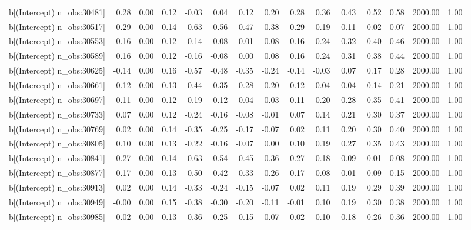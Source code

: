 \begin{table}[ht]
\begin{tabular}{rrrrrrrrrrrrrrr}
  b[(Intercept) n\_obs:30481] & 0.28 & 0.00 & 0.12 & -0.03 & 0.04 & 0.12 & 0.20 & 0.28 & 0.36 & 0.43 & 0.52 & 0.58 & 2000.00 & 1.00 \\ 
  b[(Intercept) n\_obs:30517] & -0.29 & 0.00 & 0.14 & -0.63 & -0.56 & -0.47 & -0.38 & -0.29 & -0.19 & -0.11 & -0.02 & 0.07 & 2000.00 & 1.00 \\ 
  b[(Intercept) n\_obs:30553] & 0.16 & 0.00 & 0.12 & -0.14 & -0.08 & 0.01 & 0.08 & 0.16 & 0.24 & 0.32 & 0.40 & 0.46 & 2000.00 & 1.00 \\ 
  b[(Intercept) n\_obs:30589] & 0.16 & 0.00 & 0.12 & -0.16 & -0.08 & 0.00 & 0.08 & 0.16 & 0.24 & 0.31 & 0.38 & 0.44 & 2000.00 & 1.00 \\ 
  b[(Intercept) n\_obs:30625] & -0.14 & 0.00 & 0.16 & -0.57 & -0.48 & -0.35 & -0.24 & -0.14 & -0.03 & 0.07 & 0.17 & 0.28 & 2000.00 & 1.00 \\ 
  b[(Intercept) n\_obs:30661] & -0.12 & 0.00 & 0.13 & -0.44 & -0.35 & -0.28 & -0.20 & -0.12 & -0.04 & 0.04 & 0.14 & 0.21 & 2000.00 & 1.00 \\ 
  b[(Intercept) n\_obs:30697] & 0.11 & 0.00 & 0.12 & -0.19 & -0.12 & -0.04 & 0.03 & 0.11 & 0.20 & 0.28 & 0.35 & 0.41 & 2000.00 & 1.00 \\ 
  b[(Intercept) n\_obs:30733] & 0.07 & 0.00 & 0.12 & -0.24 & -0.16 & -0.08 & -0.01 & 0.07 & 0.14 & 0.21 & 0.30 & 0.37 & 2000.00 & 1.00 \\ 
  b[(Intercept) n\_obs:30769] & 0.02 & 0.00 & 0.14 & -0.35 & -0.25 & -0.17 & -0.07 & 0.02 & 0.11 & 0.20 & 0.30 & 0.40 & 2000.00 & 1.00 \\ 
  b[(Intercept) n\_obs:30805] & 0.10 & 0.00 & 0.13 & -0.22 & -0.16 & -0.07 & 0.00 & 0.10 & 0.19 & 0.27 & 0.35 & 0.43 & 2000.00 & 1.00 \\ 
  b[(Intercept) n\_obs:30841] & -0.27 & 0.00 & 0.14 & -0.63 & -0.54 & -0.45 & -0.36 & -0.27 & -0.18 & -0.09 & -0.01 & 0.08 & 2000.00 & 1.00 \\ 
  b[(Intercept) n\_obs:30877] & -0.17 & 0.00 & 0.13 & -0.50 & -0.42 & -0.33 & -0.26 & -0.17 & -0.08 & -0.01 & 0.09 & 0.15 & 2000.00 & 1.00 \\ 
  b[(Intercept) n\_obs:30913] & 0.02 & 0.00 & 0.14 & -0.33 & -0.24 & -0.15 & -0.07 & 0.02 & 0.11 & 0.19 & 0.29 & 0.39 & 2000.00 & 1.00 \\ 
  b[(Intercept) n\_obs:30949] & -0.00 & 0.00 & 0.15 & -0.38 & -0.30 & -0.20 & -0.11 & -0.01 & 0.10 & 0.19 & 0.30 & 0.38 & 2000.00 & 1.00 \\ 
  b[(Intercept) n\_obs:30985] & 0.02 & 0.00 & 0.13 & -0.36 & -0.25 & -0.15 & -0.07 & 0.02 & 0.10 & 0.18 & 0.26 & 0.36 & 2000.00 & 1.00 \\ 

\end{tabular}
\end{table}
